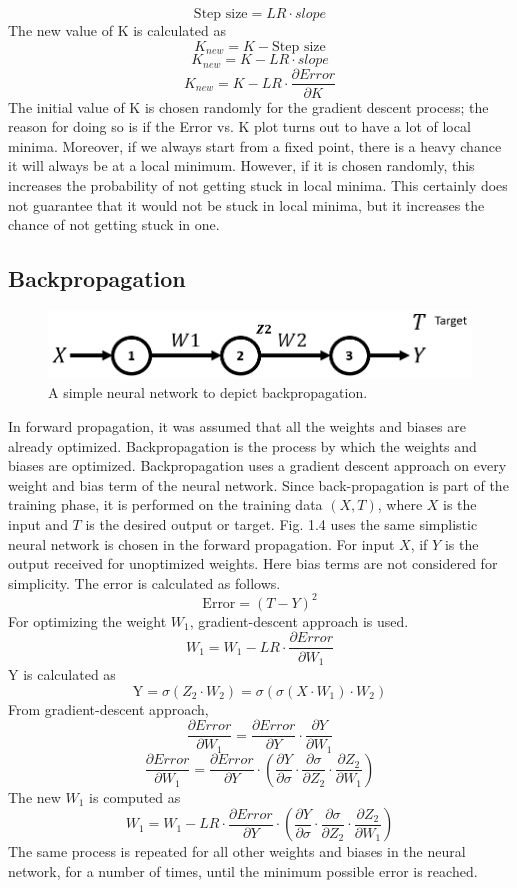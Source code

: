 \documentclass[12pt,a4paper,bold]{thesis}
\theoremstyle{thm}
\theoremstyle{definition}
\begin{document}
\[\text{Step size} = LR \cdot slope\]
The new value of K is calculated as
\[K_{new}=K - \text{Step size}\]  
\[K_{new}=K - LR \cdot slope\]
\[K_{new}=K - LR \cdot \frac{\partial Error}{\partial K}\]
\indent The initial value of K is chosen randomly for the gradient descent process; the reason for doing so is if the Error vs. K plot turns out to have a lot of local minima. Moreover, if we always start from a fixed point, there is a heavy chance it will always be at a local minimum. However, if it is chosen randomly, this increases the probability of not getting stuck in local minima. This certainly does not guarantee that it would not be stuck in local minima, but it increases the chance of not getting stuck in one.


\subsection{Backpropagation}
\begin{figure}[H]
	\centering
   \includegraphics[scale=0.56]{Images/38.png} 
   \caption{A simple neural network to depict backpropagation.}
\end{figure}

\indent\indent In forward propagation, it was assumed that all the weights and biases are already optimized. Backpropagation is the process by which the weights and biases are optimized. Backpropagation uses a gradient descent approach on every weight and bias term of the neural network. Since back-propagation is part of the training phase, it is performed on the training data $(X, T)$, where $X$ is the input and $T$ is the desired output or target. 
Fig. 1.4 uses the same simplistic neural network is chosen in the forward propagation. For input $X$, if $Y$ is the output received for unoptimized weights. Here bias terms are not considered for simplicity. 
The error is calculated as follows. 
\[\text{Error} = (T - Y)^2\]
For optimizing the weight $W_1$, gradient-descent approach is used.
\[W_1=W_1-LR \cdot \frac{\partial Error}{\partial W_1}\]
Y is calculated as 
\[\text{Y}=\sigma(Z_2 \cdot W_2)=\sigma(\sigma(X \cdot W_1)\cdot W_2)\]
From gradient-descent approach,
\[\frac{\partial Error}{\partial W_1}=\frac{\partial Error}{\partial Y} \cdot \frac{\partial Y}{\partial W_1}\]
\[\frac{\partial Error}{\partial W_1}=\frac{\partial Error}{\partial Y} \cdot \left(\frac{\partial Y}{\partial \sigma}\cdot \frac{\partial \sigma}{\partial Z_2} \cdot \frac{\partial Z_2}{\partial W_1}\right)\]
The new $W_1$ is computed as
\[W_1=W_1-LR \cdot \frac{\partial Error}{\partial Y} \cdot \left(\frac{\partial Y}{\partial \sigma}\cdot \frac{\partial \sigma}{\partial Z_2} \cdot \frac{\partial Z_2}{\partial W_1}\right)\]
The same process is repeated for all other weights and biases in the neural network, for a number of times, until the minimum possible error is reached.
\pagebreak
\end{document}
